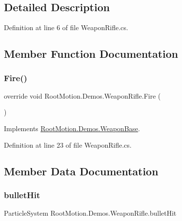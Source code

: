 \subsection{Detailed Description}


Definition at line 6 of file Weapon\+Rifle.\+cs.



\subsection{Member Function Documentation}
\mbox{\label{class_root_motion_1_1_demos_1_1_weapon_rifle_addde8b0d4aa215578c749c96c58b702c}} 
\subsubsection{\texorpdfstring{Fire()}{Fire()}}
{\footnotesize\ttfamily override void Root\+Motion.\+Demos.\+Weapon\+Rifle.\+Fire (\begin{DoxyParamCaption}{ }\end{DoxyParamCaption})\hspace{0.3cm}{\ttfamily [virtual]}}



Implements \mbox{\hyperlink{class_root_motion_1_1_demos_1_1_weapon_base_ae0c2eda9d6c7f249bc08d670fb9dd7ff}{Root\+Motion.\+Demos.\+Weapon\+Base}}.



Definition at line 23 of file Weapon\+Rifle.\+cs.



\subsection{Member Data Documentation}
\mbox{\label{class_root_motion_1_1_demos_1_1_weapon_rifle_a162f22cba9940d8892e9d00454a89c84}} 
\subsubsection{\texorpdfstring{bullet\+Hit}{bulletHit}}
{\footnotesize\ttfamily Particle\+System Root\+Motion.\+Demos.\+Weapon\+Rifle.\+bullet\+Hit}



